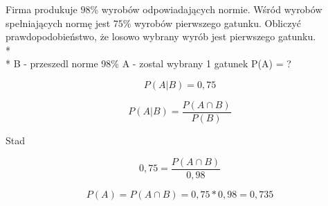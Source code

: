 \medskip
{} 
\medskip

Firma produkuje $98$\% wyrobów odpowiadających normie. Wśród wyrobów spełniających normę jest $75$\% wyrobów pierwszego gatunku. Obliczyć prawdopodobieństwo, że losowo wybrany wyrób jest pierwszego gatunku. \\* \\*		
B - przeszedl norme  98\%  \newline
A - zostal wybrany 1 gatunek \newline
P(A) = ?

$$ P(A|B) = 0,75 $$

$$ P(A|B) = \dfrac{P(A \cap B)}{ P(B)} $$

Stad

$$ 0,75 = \dfrac{P(A \cap B)}{0,98} $$

$$ P(A) = P(A \cap B) = 0,75 * 0, 98 = 0,735 $$
